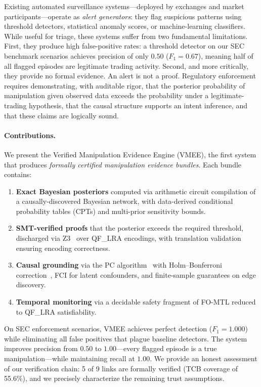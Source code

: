 \documentclass[11pt]{article}
\begin{document}
Existing automated surveillance systems---deployed by exchanges and market participants---operate as \emph{alert generators}: they flag suspicious patterns using threshold detectors, statistical anomaly scores, or machine-learning classifiers.
While useful for triage, these systems suffer from two fundamental limitations.
First, they produce high false-positive rates: a threshold detector on our SEC benchmark scenarios achieves precision of only $0.50$ ($F_1 = 0.67$), meaning half of all flagged episodes are legitimate trading activity.
Second, and more critically, they provide no formal evidence.
An alert is not a proof.
Regulatory enforcement requires demonstrating, with auditable rigor, that the posterior probability of manipulation given observed data exceeds the probability under a legitimate-trading hypothesis, that the causal structure supports an intent inference, and that these claims are logically sound.

\paragraph{Contributions.}
We present the Verified Manipulation Evidence Engine (VMEE), the first system that produces \emph{formally certified manipulation evidence bundles}.
Each bundle contains:
\begin{enumerate}[nosep]
  \item \textbf{Exact Bayesian posteriors} computed via arithmetic circuit compilation of a causally-discovered Bayesian network, with data-derived conditional probability tables (CPTs) and multi-prior sensitivity bounds.
  \item \textbf{SMT-verified proofs} that the posterior exceeds the required threshold, discharged via Z3~\cite{demoura2008} over QF\_LRA encodings, with translation validation ensuring encoding correctness.
  \item \textbf{Causal grounding} via the PC algorithm~\cite{spirtes2000} with Holm--Bonferroni correction~\cite{holm1979}, FCI for latent confounders, and finite-sample guarantees on edge discovery.
  \item \textbf{Temporal monitoring} via a decidable safety fragment of FO-MTL reduced to QF\_LRA satisfiability.
\end{enumerate}

On SEC enforcement scenarios, VMEE achieves perfect detection ($F_1 = 1.000$) while eliminating all false positives that plague baseline detectors.
The system improves precision from $0.50$ to $1.00$---every flagged episode is a true manipulation---while maintaining recall at $1.00$.
We provide an honest assessment of our verification chain: 5 of 9 links are formally verified (TCB coverage of 55.6\%), and we precisely characterize the remaining trust assumptions.
\end{document}
